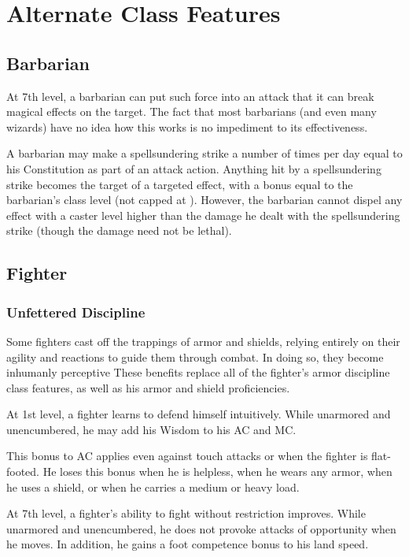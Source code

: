 \chapter{Alternate Class Features}

\section{Barbarian}

 At 7th level, a barbarian can put such force into an attack that it can break magical effects on the target. The fact that most barbarians (and even many wizards) have no idea how this works is no impediment to its effectiveness.
\par A barbarian may make a spellsundering strike a number of times per day equal to his Constitution as part of an attack action. Anything hit by a spellsundering strike becomes the target of a targeted  effect, with a bonus equal to the barbarian's class level (not capped at ). However, the barbarian cannot dispel any effect with a caster level higher than the damage he dealt with the spellsundering strike (though the damage need not be lethal).

\section{Fighter}

\subsection{Unfettered Discipline}
Some fighters cast off the trappings of armor and shields, relying entirely on their agility and reactions to guide them through combat. In doing so, they become inhumanly perceptive  
These benefits replace all of the fighter's armor discipline class features, as well as his armor and shield proficiencies.

 At 1st level, a fighter learns to defend himself intuitively. While unarmored and unencumbered, he may add his Wisdom to his AC and MC.

This bonus to AC applies even against touch attacks or when the fighter is flat-footed. He loses this bonus when he is helpless, when he wears any armor, when he uses a shield, or when he carries a medium or heavy load.

 At 7th level, a fighter's ability to fight without restriction improves. While unarmored and unencumbered, he does not provoke attacks of opportunity when he moves. In addition, he gains a  foot competence bonus to his land speed.

